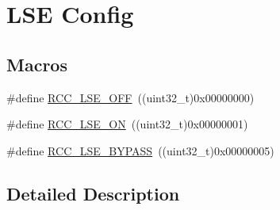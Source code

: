 \hypertarget{group___r_c_c___l_s_e___config}{\section{L\-S\-E Config}
\label{group___r_c_c___l_s_e___config}
}
\subsection*{Macros}
\begin{DoxyCompactItemize}
\item 
\#define \hyperlink{group___r_c_c___l_s_e___config_ga6645c27708d0cad1a4ab61d2abb24c77}{R\-C\-C\-\_\-\-L\-S\-E\-\_\-\-O\-F\-F}~((uint32\-\_\-t)0x00000000)
\item 
\#define \hyperlink{group___r_c_c___l_s_e___config_gac981ea636c2f215e4473901e0912f55a}{R\-C\-C\-\_\-\-L\-S\-E\-\_\-\-O\-N}~((uint32\-\_\-t)0x00000001)
\item 
\#define \hyperlink{group___r_c_c___l_s_e___config_gaad580157edbae878edbcc83c5a68e767}{R\-C\-C\-\_\-\-L\-S\-E\-\_\-\-B\-Y\-P\-A\-S\-S}~((uint32\-\_\-t)0x00000005)
\end{DoxyCompactItemize}


\subsection{Detailed Description}


